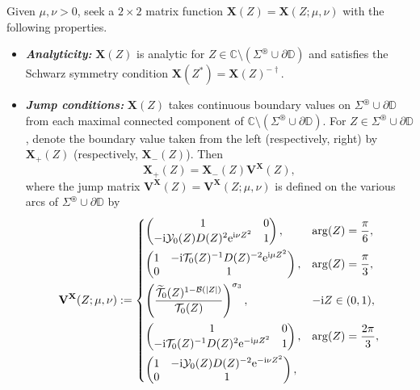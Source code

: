 \documentclass[12pt]{amsart}
\numberwithin{equation}{section}
\newcommand{\ee}{\mathrm{e}}
\newcommand{\ii}{\mathrm{i}}
\begin{document}
\begin{myrhp}
Given $\mu, \nu >0$, seek a $2\times 2$ matrix function $\mathbf{X}(Z)=\mathbf{X}(Z;\mu,\nu)$ with the following properties.
\begin{itemize}
\item[]\textit{\textbf{Analyticity:}}  $\mathbf{X}(Z)$ is analytic for $Z\in \mathbb{C}\setminus (\Sigma^\circledast \cup \partial{\mathbb{D}})$ and satisfies the Schwarz symmetry condition $\mathbf{X}(Z^*)=\mathbf{X}(Z)^{-\dagger}$.
\item[]\textit{\textbf{Jump conditions:}} $\mathbf{X}(Z)$ takes continuous boundary values on $\Sigma^\circledast \cup \partial{\mathbb{D}}$ from each maximal connected component of $\mathbb{C}\setminus (\Sigma^\circledast \cup \partial\mathbb{D})$.  For $Z \in \Sigma^\circledast \cup \partial\mathbb{D}$, denote the boundary value taken from the left (respectively, right) by $\mathbf{X}_+(Z)$ (respectively, $\mathbf{X}_-(Z)$).  Then 
\begin{equation}
	\mathbf{X}_+(Z)=\mathbf{X}_-(Z)\mathbf{V^X}(Z),
\end{equation}
where the jump matrix $\mathbf{V^X}(Z)=\mathbf{V^X}(Z;\mu,\nu)$ is defined on the various arcs of $\Sigma^\circledast \cup \partial \mathbb{D}$ by 
\begin{equation}
\mathbf{V^X}(Z;\mu,\nu):= \begin{dcases}
	\begin{pmatrix} 1 & 0 \\ -\ii \mathcal{Y}_0(Z) D(Z)^{2} \ee^{\ii \nu Z^2} & 1 \end{pmatrix}, 
	 & \arg(Z) = \frac{\pi}{6}, \\
	\begin{pmatrix} 1 &  -\ii \mathcal{T}_0(Z)^{-1} D(Z)^{-2} \ee^{\ii\mu Z^2} \\ 0 & 1 \end{pmatrix},
	 & \arg(Z) = \frac{\pi}{3}, \\
	\left( \frac{\widetilde{\mathcal{T}}_0(Z)^{1-\mathcal{B}(|Z|)}}{\mathcal{T}_0(Z)} \right)^{\sigma_3},
 	 &  -\ii Z \in (0,1) , \\
	\begin{pmatrix} 1 & 0 \\ -\ii \mathcal{T}_0(Z)^{-1} D(Z)^{2} \ee^{-\ii\mu Z^2}  & 1 \end{pmatrix},
	 & \arg(Z) = \frac{2\pi}{3}, \\ 
	\begin{pmatrix} 1 & -\ii \mathcal{Y}_0(Z) D(Z)^{-2} \ee^{-\ii \nu Z^2}\\ 0&  1 \end{pmatrix}, 

\end{dcases}
\end{equation}
\end{itemize}
\end{myrhp}
\end{document}
